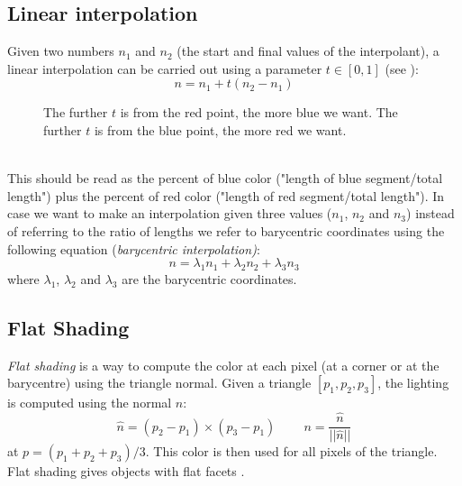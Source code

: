 \subsection{Linear interpolation}\label{section:linear-interpolation}
Given two numbers $n_1$ and $n_2$ (the start and final values of the interpolant), a linear interpolation can be carried out using a parameter $t\in[0,1]$ (see \cite{WEBSITE:interpolation}):
$$ n = n_1 + t (n_2 - n_1)$$
\begin{figure}[!h]
  \centering
  \caption{The further $t$ is from the red point, the more blue we want. The further $t$ is from the blue point, the more red we want.} %
\end{figure}
\\
This should be read as the percent of blue color ("length of blue segment/total length") plus the percent of red color ("length of red segment/total length"). In case we want to make an interpolation given three values ($n_1$, $n_2$ and $n_3$) instead of referring to the ratio of lengths we refer to barycentric coordinates using the following equation (\textit{barycentric interpolation)}:
$$ n = \lambda_1n_1 + \lambda_2n_2 + \lambda_3n_3$$
where $\lambda_1$, $\lambda_2$ and $\lambda_3$ are the barycentric coordinates.


\subsection{Flat Shading}
\textit{Flat shading} is a way to compute the color at each pixel (at a corner or at the barycentre) using the triangle normal.
Given a triangle $[p_1, p_2, p_3]$, the lighting is computed using the normal $n$: $$\widehat{n} = (p_2 - p_1) \times (p_3 - p_1) \;\;\;\;\;\;\;\; n = \frac{ \widehat{n} } { ||\widehat{n}|| } $$ at $p= (p_1 + p_2 + p_3)/3$. This color is then used for all pixels of the triangle. Flat shading gives objects with flat facets \cite{SLIDE:ICORSI}.

